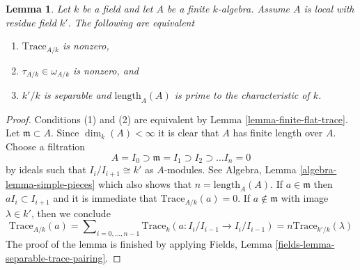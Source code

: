 \documentclass[10pt,a4paper]{amsart}
\theoremstyle{plain}
\newtheorem{lemma}[subsection]{Lemma}
\theoremstyle{definition}
\theoremstyle{remark}
\numberwithin{equation}{subsection}
\begin{document}
\begin{lemma}
\label{lemma-tau-nonzero}
Let $k$ be a field and let $A$ be a finite $k$-algebra. Assume $A$
is local with residue field $k'$. The following are equivalent
\begin{enumerate}
\item $\text{Trace}_{A/k}$ is nonzero,
\item $\tau_{A/k} \in \omega_{A/k}$ is nonzero, and
\item $k'/k$ is separable and $\text{length}_A(A)$ is prime
to the characteristic of $k$.
\end{enumerate}
\end{lemma}

\begin{proof}
Conditions (1) and (2) are equivalent by Lemma \ref{lemma-finite-flat-trace}.
Let $\mathfrak m \subset A$. Since $\dim_k(A) < \infty$ it is clear that
$A$ has finite length over $A$. Choose a filtration
$$
A = I_0 \supset \mathfrak m = I_1 \supset I_2 \supset \ldots I_n = 0
$$
by ideals such that $I_i/I_{i + 1} \cong k'$ as $A$-modules. See
Algebra, Lemma \ref{algebra-lemma-simple-pieces} which also shows that
$n = \text{length}_A(A)$. If $a \in \mathfrak m$ then $aI_i \subset I_{i + 1}$
and it is immediate that $\text{Trace}_{A/k}(a) = 0$.
If $a \not \in \mathfrak m$ with image $\lambda \in k'$, then
we conclude
$$
\text{Trace}_{A/k}(a) =
\sum\nolimits_{i = 0, \ldots, n - 1}
\text{Trace}_k(a : I_i/I_{i - 1} \to I_i/I_{i - 1}) =
n \text{Trace}_{k'/k}(\lambda)
$$
The proof of the lemma is finished by applying
Fields, Lemma \ref{fields-lemma-separable-trace-pairing}.
\end{proof}
\end{document}
